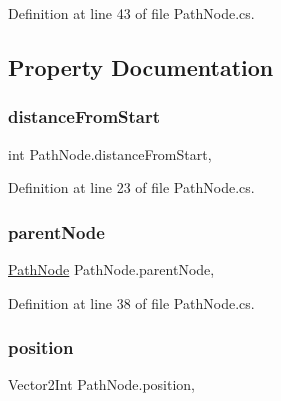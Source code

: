 Definition at line 43 of file Path\+Node.\+cs.



\subsection{Property Documentation}
\mbox{\label{class_path_node_a4aefccdcbd1561396d0b7d93f3738c38}} 
\subsubsection{\texorpdfstring{distanceFromStart}{distanceFromStart}}
{\footnotesize\ttfamily int Path\+Node.\+distance\+From\+Start\hspace{0.3cm}{\ttfamily [get]}, {\ttfamily [set]}}



Definition at line 23 of file Path\+Node.\+cs.

\mbox{\label{class_path_node_abb55342c621b16a3eab5cc4d254fe419}} 
\subsubsection{\texorpdfstring{parentNode}{parentNode}}
{\footnotesize\ttfamily \mbox{\hyperlink{class_path_node}{Path\+Node}} Path\+Node.\+parent\+Node\hspace{0.3cm}{\ttfamily [get]}, {\ttfamily [set]}}



Definition at line 38 of file Path\+Node.\+cs.

\mbox{\label{class_path_node_adb09edeff29736df426b6c665f773906}} 
\subsubsection{\texorpdfstring{position}{position}}
{\footnotesize\ttfamily Vector2\+Int Path\+Node.\+position\hspace{0.3cm}{\ttfamily [get]}, {\ttfamily [set]}}




